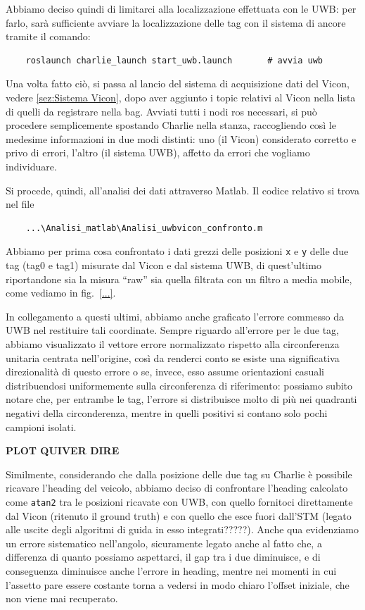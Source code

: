 Abbiamo deciso quindi di limitarci alla localizzazione effettuata con le UWB: per farlo, sarà sufficiente avviare la localizzazione delle tag con il sistema di 
ancore tramite il comando:
\begin{verbatim}
	roslaunch charlie_launch start_uwb.launch		# avvia uwb
\end{verbatim} 

Una volta fatto ciò, si passa al lancio del sistema di acquisizione dati del Vicon, vedere \ref{sez:Sistema Vicon}, dopo aver aggiunto i topic relativi al Vicon
nella lista di quelli da registrare nella bag. 
Avviati tutti i nodi ros necessari, si può procedere semplicemente spostando Charlie nella stanza, raccogliendo così le medesime informazioni in due modi distinti: 
uno (il Vicon) considerato corretto e privo di errori, l'altro (il sistema UWB), affetto da errori che vogliamo individuare.

Si procede, quindi, all'analisi dei dati attraverso Matlab. Il codice relativo si trova nel file
\begin{verbatim}
	...\Analisi_matlab\Analisi_uwbvicon_confronto.m
\end{verbatim}  
Abbiamo per prima cosa confrontato i dati grezzi delle posizioni \verb|x| e \verb|y| delle due tag (tag0 e tag1) misurate dal Vicon e dal sistema UWB, di quest'ultimo 
riportandone sia la misura ``raw'' sia quella filtrata con un filtro a media mobile, come vediamo in fig.~\ref{...}.

In collegamento a questi ultimi, abbiamo anche graficato l'errore commesso da UWB nel restituire tali coordinate.
Sempre riguardo all'errore per le due tag, abbiamo visualizzato il vettore errore normalizzato rispetto alla circonferenza unitaria centrata nell'origine, così da 
renderci conto se esiste una significativa direzionalità di questo errore o se, invece, esso assume orientazioni casuali distribuendosi uniformemente sulla 
circonferenza di riferimento: possiamo subito notare che, per entrambe le tag, l'errore si distribuisce molto di più nei quadranti negativi della circonderenza,
mentre in quelli positivi si contano solo pochi campioni isolati.

\textbf{PLOT QUIVER DIRE}

Similmente, considerando che dalla posizione delle due tag su Charlie è possibile ricavare l'heading del veicolo, abbiamo deciso di confrontare l'heading calcolato
come \verb|atan2| tra le posizioni ricavate con UWB, con quello fornitoci direttamente dal Vicon (ritenuto il ground truth) e con quello che esce fuori dall'STM 
(legato alle uscite degli algoritmi di guida in esso integrati?????). Anche qua evidenziamo un errore sistematico nell'angolo, sicuramente legato anche al fatto 
che, a differenza di quanto possiamo aspettarci, il gap tra i due diminuisce, e di conseguenza diminuisce anche l'errore in heading, mentre nei momenti in cui 
l'assetto pare essere costante torna a vedersi in modo chiaro l'offset iniziale, che non viene mai recuperato.

